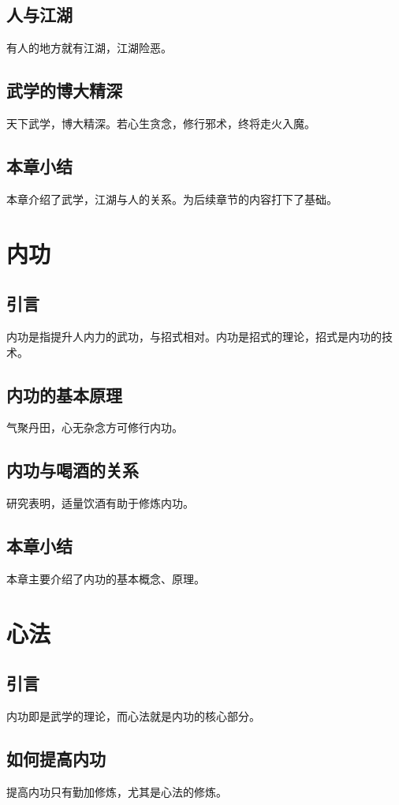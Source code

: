 \documentclass[algorithmlist, figurelist,tablelist, nomlist,masters]{seuthesix}
\begin{document}
\section{人与江湖}
有人的地方就有江湖，江湖险恶。

\section{武学的博大精深}
天下武学，博大精深。若心生贪念，修行邪术，终将走火入魔。

\section{本章小结}
本章介绍了武学，江湖与人的关系。为后续章节的内容打下了基础。

\chapter{内功}
\section{引言}
内功是指提升人内力的武功，与招式相对。内功是招式的理论，招式是内功的技术。

\section{内功的基本原理}
气聚丹田，心无杂念方可修行内功。

\section{内功与喝酒的关系}
研究表明，适量饮酒有助于修炼内功。



\section{本章小结}
本章主要介绍了内功的基本概念、原理。

\chapter{心法}
\section{引言}
内功即是武学的理论，而心法就是内功的核心部分。
\section{如何提高内功}
提高内功只有勤加修炼，尤其是心法的修炼。
\end{document}
